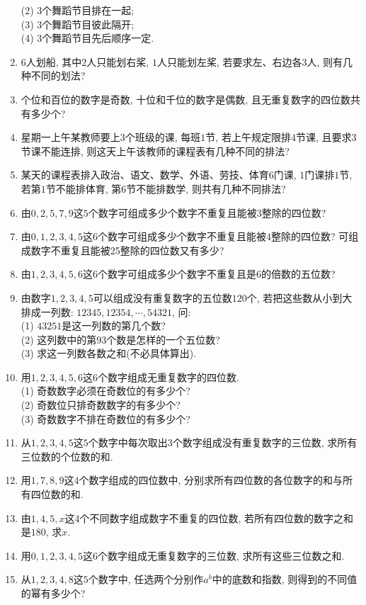 \documentclass[10pt,a4paper]{article}
\begin{document}
\begin{enumerate}[1.]
(2) $3$个舞蹈节目排在一起;\\
(3) $3$个舞蹈节目彼此隔开;\\
(4) $3$个舞蹈节目先后顺序一定.
\item $6$人划船, 其中$2$人只能划右桨, $1$人只能划左桨, 若要求左、右边各$3$人, 则有几种不同的划法?
\item 个位和百位的数字是奇数, 十位和千位的数字是偶数, 且无重复数字的四位数共有多少个?
\item 星期一上午某教师要上$3$个班级的课, 每班$1$节, 若上午规定限排$4$节课, 且要求$3$节课不能连排, 则这天上午该教师的课程表有几种不同的排法?
\item 某天的课程表排入政治、语文、数学、外语、劳技、体育$6$门课, $1$门课排$1$节, 若第$1$节不能排体育, 第$6$节不能排数学, 则共有几种不同排法?
\item 由$0, 2, 5, 7, 9$这$5$个数字可组成多少个数字不重复且能被$3$整除的四位数?
\item 由$0, 1, 2, 3, 4, 5$这$6$个数字可组成多少个数字不重复且能被$4$整除的四位数? 可组成数字不重复且能被25整除的四位数又有多少?
\item 由$1, 2, 3, 4, 5, 6$这$6$个数字可组成多少个数字不重复且是$6$的倍数的五位数?
\item 由数字$1,2, 3, 4, 5$可以组成没有重复数字的五位数$120$个, 若把这些数从小到大排成一列数: $12345, 12354, \cdots,54321$, 问:\\
(1) $43251$是这一列数的第几个数?\\
(2) 这列数中的第$93$个数是怎样的一个五位数?\\
(3) 求这一列数各数之和(不必具体算出).
\item 用$1, 2, 3, 4, 5, 6$这$6$个数字组成无重复数字的四位数.\\
(1) 奇数数字必须在奇数位的有多少个?\\
(2) 奇数位只排奇数数字的有多少个?\\
(3) 奇数数字不排在奇数位的有多少个?
\item 从$1, 2, 3, 4, 5$这$5$个数字中每次取出$3$个数字组成没有重复数字的三位数, 求所有三位数的个位数的和.
\item 用$1, 7, 8, 9$这$4$个数字组成的四位数中, 分别求所有四位数的各位数字的和与所有四位数的和.
\item 由$1, 4, 5, x$这$4$个不同数字组成数字不重复的四位数, 若所有四位数的数字之和是$180$, 求$x$.
\item 用$0, 1, 2, 3, 4, 5$这$6$个数字组成无重复数字的三位数, 求所有这些三位数之和.
\item 从$1, 2, 3, 4, 8$这$5$个数字中, 任选两个分别作$a^b$中的底数和指数, 则得到的不同值的幂有多少个?

\end{enumerate}
\end{document}
